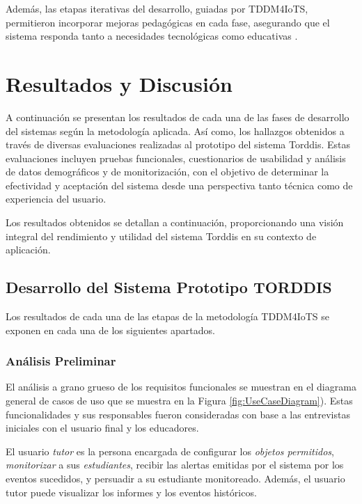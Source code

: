 Además, las etapas iterativas del desarrollo, guiadas por TDDM4IoTS, permitieron incorporar mejoras pedagógicas en cada fase, asegurando que el sistema responda tanto a necesidades tecnológicas como educativas \citep{Huang2025How}.

\section{Resultados y Discusión}
\label{seccion:Cinco}
A continuación se presentan los resultados de cada una de las fases de desarrollo del sistemas según la metodología aplicada. Así como, los hallazgos obtenidos a través de diversas evaluaciones realizadas al prototipo del sistema Torddis. Estas evaluaciones incluyen pruebas funcionales, cuestionarios de usabilidad y análisis de datos demográficos y de monitorización, con el objetivo de determinar la efectividad y aceptación del sistema desde una perspectiva tanto técnica como de experiencia del usuario.

Los resultados obtenidos se detallan a continuación, proporcionando una visión integral del rendimiento y utilidad del sistema Torddis en su contexto de aplicación.

\subsection{Desarrollo del Sistema Prototipo TORDDIS}
Los resultados de cada una de las etapas de la metodología TDDM4IoTS \citep{Guerrero-Ulloa2020TDDM4IoTS} se exponen en cada una de los siguientes apartados.

\subsubsection{Análisis Preliminar}
El análisis a grano grueso de los requisitos funcionales se muestran en el diagrama general de casos de uso que se muestra en la Figura \ref{fig:UseCaseDiagram}). Estas funcionalidades y sus responsables fueron consideradas con base a las entrevistas iniciales con el usuario final y los educadores.

El usuario \textit{tutor} es la persona encargada de configurar los \textit{objetos permitidos}, \textit{monitorizar} a sus \textit{estudiantes}, recibir las alertas emitidas por el sistema por los eventos sucedidos, y persuadir a su estudiante monitoreado. Además, el usuario tutor puede visualizar los informes y los eventos históricos.

